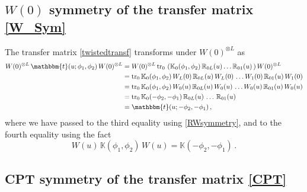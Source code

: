 \documentclass[12pt]{article}
\numberwithin{equation}{section}
\begin{document}
	\subsection{\texorpdfstring{$W(0)$}{W(0)} symmetry of the transfer matrix \eqref{W_Sym}}
	
	The transfer matrix \eqref{twistedtransf} transforms under $W(0)^{\otimes L}$ as
	\begin{align}
		W(0)^{\otimes L}\,  
		\mathbbm{t}(u; \phi_1, \phi_2)\, W(0)^{\otimes L} & = W(0)^{\otimes L}\, \mathrm{tr}_{0}\, \left(  \mathbb{K}_0(\phi_1, \phi_2)\, \mathbb{R}_{0L}(u)\dots \mathbb{R}_{01}(u)\, \right) W(0)^{\otimes L} \nonumber \\
		& =  \mathrm{tr}_{0}\, \mathbb{K}_0(\phi_1, \phi_2)\, W_L(0)\, \mathbb{R}_{0L}(u)\, W_L(0)\, \dots W_1(0)\,\mathbb{R}_{01}(u)\, W_1(0) \nonumber \\
		& =  \mathrm{tr}_{0}\, \mathbb{K}_0(\phi_1, \phi_2)\, W_0(u)\, \mathbb{R}_{0L}(u)\, W_0(u)\, \dots W_0(u)\,\mathbb{R}_{01}(u)\, W_0(u) \nonumber \\
		& =  \mathrm{tr}_{0}\, \mathbb{K}_0(-\phi_2, -\phi_1)\,  \mathbb{R}_{0L}(u)\,  \dots \,\mathbb{R}_{01}(u) \nonumber \\
		& = \mathbbm{t}(u; -\phi_2, -\phi_1)\,,
		\label{Wsymproof}
	\end{align}
	where we have passed to the third equality using \eqref{RWsymmetry}, and to the fourth equality using the fact
	\begin{equation}
		W(u)\, \mathbb{K}(\phi_1, \phi_2)\, W(u) =  \mathbb{K}(-\phi_2, -\phi_1) \,. 
	\end{equation}
	
	\subsection{CPT symmetry of the transfer matrix \eqref{CPT}}
	
\end{document}
